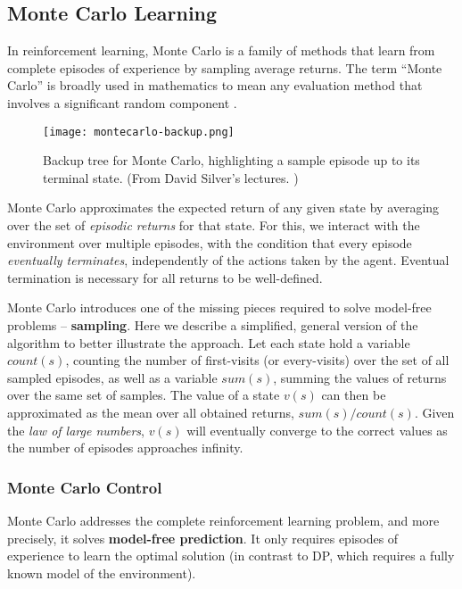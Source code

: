 \clearpage

\subsection{Monte Carlo Learning} \label{rl:mc}
In reinforcement learning, Monte Carlo is a family of methods that learn from complete episodes of experience by sampling average returns.
The term “Monte Carlo” is broadly used in mathematics to mean any evaluation method that involves a significant random component \cite{rlai}.

\begin{figure}[ht]
    \caption{Backup tree for Monte Carlo, highlighting a sample episode up to its terminal state. (From David Silver's lectures. \cite{silver-lectures})}
    \centering
    \texttt{[image: montecarlo-backup.png]}
\end{figure}

Monte Carlo approximates the expected return of any given state by averaging over the set of \emph{episodic returns} for that state.
For this, we interact with the environment over multiple episodes, with the condition that every episode \emph{eventually terminates}, independently of the actions taken by the agent.
Eventual termination is necessary for all returns to be well-defined.

Monte Carlo introduces one of the missing pieces required to solve model-free problems -- \textbf{sampling}.
Here we describe a simplified, general version of the algorithm to better illustrate the approach.
Let each state hold a variable $count(s)$, counting the number of first-visits (or every-visits) over the set of all sampled episodes, as well as a variable $sum(s)$, summing the values of returns over the same set of samples.
The value of a state $v(s)$ can then be approximated as the mean over all obtained returns, $sum(s) / count(s)$.
Given the \emph{law of large numbers}, $v(s)$ will eventually converge to the correct values as the number of episodes approaches infinity.

\subsubsection{Monte Carlo Control}
Monte Carlo addresses the complete reinforcement learning problem, and more precisely, it solves \textbf{model-free prediction}.
It only requires episodes of experience to learn the optimal solution (in contrast to DP, which requires a fully known model of the environment).

